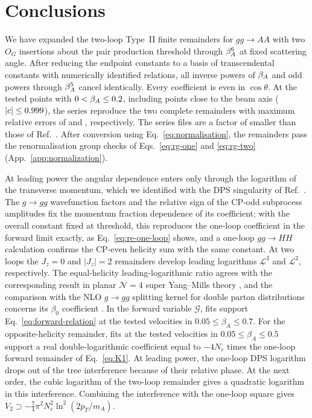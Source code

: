 \section{Conclusions}
\label{sec:conclusions}

We have expanded the two-loop Type~II finite remainders for $gg\to AA$
with two $O_G$ insertions about the pair production threshold through
$\beta_A^6$ at fixed scattering angle.
After reducing the endpoint constants to a basis of \BasisCountWord{}
transcendental constants with numerically identified relations, all
inverse powers of $\beta_A$ and odd powers
through $\beta_A^5$ cancel identically. Every coefficient is even in
$\cos\theta$.
At the tested points with $0<\beta_A\leq0.2$, including points
close to the beam axis ($|c|\leq0.999$), the series reproduce the
two complete remainders with maximum
relative errors of \PoneErrLePointTwo{} and \PtwoErrLePointTwo{},
respectively.
The series files are a factor of \SizeRatio{} smaller than those of
Ref.~\cite{Bhattacharya:2019bmd}.
After conversion using Eq.~\eqref{eq:normalisation}, the remainders pass
the renormalisation group checks of Eqs.~\eqref{eq:rg-one} and
\eqref{eq:rg-two} (App.~\ref{app:normalization}).


At leading power the angular dependence enters only through the logarithm
of the transverse momentum, which we identified with the DPS singularity of
Ref.~\cite{GauntStirling2011}. The $g\to gg$ wavefunction factors and the
relative sign of the CP-odd subprocess amplitudes fix the momentum fraction
dependence of its coefficient; with the overall constant fixed at
threshold, this reproduces the one-loop coefficient in the forward limit
exactly, as Eq.~\eqref{eq:re-one-loop} shows, and a one-loop $gg\to HH$
calculation confirms
the CP-even helicity sum with the same constant.
%
%
At two loops the $J_z=0$ and $|J_z|=2$ remainders develop leading logarithms $\mathcal{L}^3$ and $\mathcal{L}^2$, respectively.
The equal-helicity leading-logarithmic ratio agrees with the corresponding result in planar $\mathcal{N}=4$ super Yang--Mills theory \cite{DixonEsterlis2016,DixonEsterlis2016Erratum}, and the comparison with the NLO $g\to gg$ splitting kernel for double parton distributions concerns its $\beta_0$ coefficient \cite{Diehl:2019rdh}.
In the forward variable $\mathcal{G}$, fits support Eq.~\eqref{eq:forward-relation} at the tested velocities in $0.05\leq\beta_A\leq0.7$.
For the opposite-helicity remainder, fits at the tested velocities in $0.05\leq\beta_A\leq0.5$ support a real double-logarithmic coefficient equal to $-4N_c$ times the one-loop forward remainder of Eq.~\eqref{eq:K1}.
At leading power, the one-loop DPS logarithm drops out of the tree interference because of their relative phase.
At the next order, the cubic logarithm of the two-loop remainder gives a quadratic logarithm in this interference.
Combining the interference with the one-loop square gives $V_2\supset-\frac{7}{4}\pi^2N_c^2\ln^2(2p_T/m_A)$.

